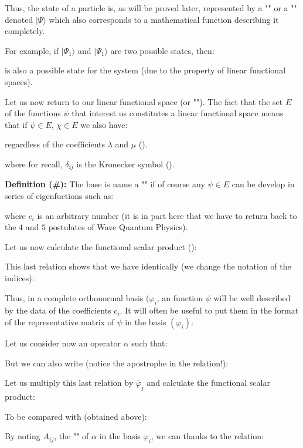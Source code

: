 	Thus, the state of a particle is, as will be proved later, represented by a "" or a "" denoted $|\Psi\rangle$ which also corresponds to a mathematical function describing it completely.

	For example, if $|\Psi_1\rangle$ and $|\Psi_1\rangle$ are two possible states, then:
	
	is also a possible state for the system (due to the property of linear functional  spaces).

	Let us now return to our linear functional  space (or ""). The fact that the set $E$ of the functions $\psi$ that interest us constitutes a linear functional space means that if $\psi\in E$, $\chi\in E$ we also have:
	
	regardless of the coefficients $\lambda$ and $\mu$ ().
	
	where for recall, $\delta_{ij}$ is the Kronecker symbol ().
	
	\textbf{Definition (\#\mydef):}
	The base is name a "" if of course any $\psi\in E$ can be develop in series of eigenfuctions such as:
	
	where $c_i$ is an arbitrary number (it is in part here that we have to return back to the $4$ and $5$ postulates of Wave Quantum Physics).

Let us now calculate the functional scalar product ():
	
	This last relation shows that we have identically (we change the notation of the indices):
	
	Thus, in a complete orthonormal basis $(\varphi_i$, an function $\psi$ will be well described by the data of the coefficients $c_i$. It will often be useful to put them in the format of the representative matrix of $\psi$ in the basis $(\varphi_i)$:
	
	Let us consider now an operator $\alpha$ such that:
	
	But we can also write (notice the apostrophe in the relation!):
	
	Let us multiply this last relation by $\bar{\varphi}_j$ and calculate the functional scalar product:
	
	To be compared with (obtained above):
	
	By noting $A_{ij}$, the "" of $\alpha$ in the basis $\varphi_i$, we can thanks to the relation:
	
